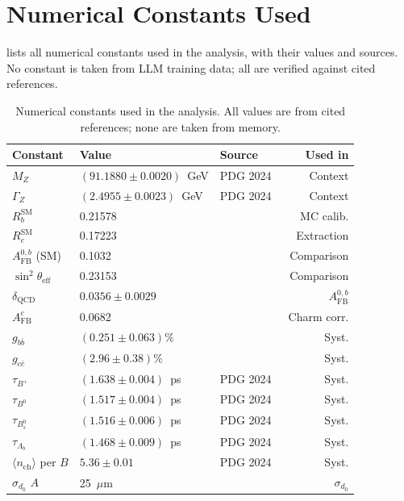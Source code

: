 \documentclass[11pt,a4paper]{article}
\begin{document}
\section{Numerical Constants Used}
\label{app:constants}

 lists all numerical constants used in
the analysis, with their values and sources.
No constant is taken from LLM training data; all are verified
against cited references.

\begin{table}[htbp]
\centering
\caption{Numerical constants used in the analysis. All values are
from cited references; none are taken from memory.}
\label{tbl:constants}
\begin{tabular}{lllr}
\toprule
Constant & Value & Source & Used in \\
\midrule
$M_Z$ & $(91.1880 \pm 0.0020)$~GeV & PDG 2024~\cite{PDG:2024} & Context \\
$\Gamma_Z$ & $(2.4955 \pm 0.0023)$~GeV & PDG 2024~\cite{PDG:2024} & Context \\
$R_b^\text{SM}$ & 0.21578 & \cite{LEP:EWWG:2005} & MC calib. \\
$R_c^\text{SM}$ & 0.17223 & \cite{LEP:EWWG:2005} & Extraction \\
$A_\text{FB}^{0,b}$ (SM) & 0.1032 & \cite{LEP:EWWG:2005} & Comparison \\
$\sin^2\theta_\text{eff}$ & 0.23153 & \cite{LEP:EWWG:2005} & Comparison \\
$\delta_\text{QCD}$ & $0.0356 \pm 0.0029$ & \cite{LEP:EWWG:2005} & $A_\text{FB}^{0,b}$ \\
$A_\text{FB}^c$ & 0.0682 & \cite{LEP:EWWG:2005} & Charm corr. \\
$g_{b\bar{b}}$ & $(0.251 \pm 0.063)\%$ & \cite{ALEPH:gbb} & Syst. \\
$g_{c\bar{c}}$ & $(2.96 \pm 0.38)\%$ & \cite{LEP:gcc} & Syst. \\
$\tau_{B^+}$ & $(1.638 \pm 0.004)$~ps & PDG 2024~\cite{PDG:2024} & Syst. \\
$\tau_{B^0}$ & $(1.517 \pm 0.004)$~ps & PDG 2024~\cite{PDG:2024} & Syst. \\
$\tau_{B_s^0}$ & $(1.516 \pm 0.006)$~ps & PDG 2024~\cite{PDG:2024} & Syst. \\
$\tau_{\Lambda_b}$ & $(1.468 \pm 0.009)$~ps & PDG 2024~\cite{PDG:2024} & Syst. \\
$\langle n_\text{ch}\rangle$ per $B$ & $5.36 \pm 0.01$ & PDG 2024~\cite{PDG:2024} & Syst. \\
$\sigma_{d_0}$ $A$ & 25~$\mu$m & \cite{ALEPH:Rb:precise} & $\sigma_{d_0}$ \\

\end{tabular}
\end{table}
\end{document}
